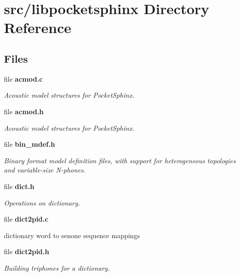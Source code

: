 \section{src/libpocketsphinx Directory Reference}
\label{dir_8d034a1e03e98d9b7ac467250bbebdea}
\subsection*{Files}
\begin{DoxyCompactItemize}
\item 
file \textbf{ acmod.\+c}
\begin{DoxyCompactList}\small\item\em Acoustic model structures for Pocket\+Sphinx. \end{DoxyCompactList}\item 
file \textbf{ acmod.\+h}
\begin{DoxyCompactList}\small\item\em Acoustic model structures for Pocket\+Sphinx. \end{DoxyCompactList}\item 
file \textbf{ bin\+\_\+mdef.\+h}
\begin{DoxyCompactList}\small\item\em Binary format model definition files, with support for heterogeneous topologies and variable-\/size N-\/phones. \end{DoxyCompactList}\item 
file \textbf{ dict.\+h}
\begin{DoxyCompactList}\small\item\em Operations on dictionary. \end{DoxyCompactList}\item 
file \textbf{ dict2pid.\+c}
\begin{DoxyCompactList}\small\item\em 
\begin{DoxyItemize}
\item dictionary word to senone sequence mappings 
\end{DoxyItemize}\end{DoxyCompactList}\item 
file \textbf{ dict2pid.\+h}
\begin{DoxyCompactList}\small\item\em Building triphones for a dictionary. \end{DoxyCompactList}\item 

\end{DoxyCompactItemize}
